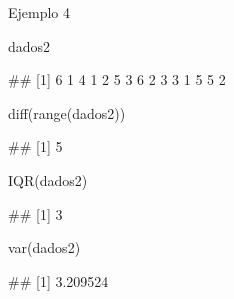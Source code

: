 \documentclass[
  ignorenonframetext,
  aspectratio=169]{beamer}
\newenvironment{Shaded}{\begin{snugshade}}{\end{snugshade}}
\newcommand{\FunctionTok}[1]{\textcolor[rgb]{0.00,0.00,0.00}{#1}}
\newcommand{\NormalTok}[1]{#1}
\let\oldverbatim\verbatim
\let\endoldverbatim\endverbatim
\renewenvironment{verbatim}{\tiny\oldverbatim}{\endoldverbatim}
\begin{document}
\begin{frame}[fragile]{Ejemplo 4}
\protect\hypertarget{ejemplo-4}{}
\begin{Shaded}
\begin{Highlighting}[]
\NormalTok{dados2}
\end{Highlighting}
\end{Shaded}

\begin{verbatim}
##  [1] 6 1 4 1 2 5 3 6 2 3 3 1 5 5 2
\end{verbatim}

\begin{Shaded}
\begin{Highlighting}[]
\FunctionTok{diff}\NormalTok{(}\FunctionTok{range}\NormalTok{(dados2))}
\end{Highlighting}
\end{Shaded}

\begin{verbatim}
## [1] 5
\end{verbatim}

\begin{Shaded}
\begin{Highlighting}[]
\FunctionTok{IQR}\NormalTok{(dados2)}
\end{Highlighting}
\end{Shaded}

\begin{verbatim}
## [1] 3
\end{verbatim}

\begin{Shaded}
\begin{Highlighting}[]
\FunctionTok{var}\NormalTok{(dados2)}
\end{Highlighting}
\end{Shaded}

\begin{verbatim}
## [1] 3.209524
\end{verbatim}
\end{frame}
\end{document}
